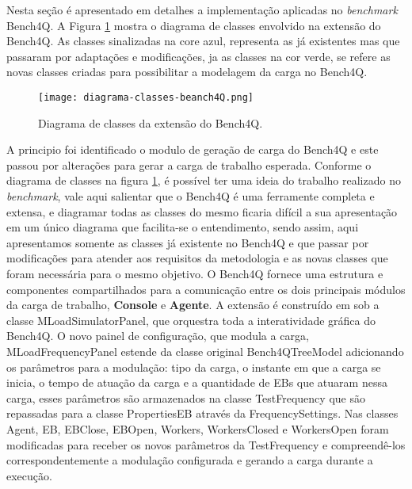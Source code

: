 Nesta seção é apresentado em detalhes a implementação aplicadas no \textit{benchmark} Bench4Q. A Figura \ref{fig:diagrama-classes} mostra o diagrama de classes envolvido na extensão do Bench4Q. As classes sinalizadas na core azul, representa as já existentes mas que passaram por adaptações e modificações, ja as classes na cor verde, se refere as novas classes criadas para possibilitar a modelagem da carga no Bench4Q.

\begin{figure}[htb]
	\centering
	\texttt{[image: diagrama-classes-beanch4Q.png]}	
	\caption{Diagrama de classes da extensão do Bench4Q.}
	\label{fig:diagrama-classes}
	\fautor
\end{figure}


A principio foi identificado o modulo de geração de carga do Bench4Q e este passou por alterações para gerar a carga de trabalho esperada. Conforme o diagrama de classes na figura \ref{fig:diagrama-classes}, é possível ter uma ideia do trabalho realizado no \textit{benchmark}, vale aqui salientar que o Bench4Q é uma ferramente completa e extensa, e diagramar todas as classes do mesmo ficaria difícil a sua apresentação em um único diagrama que facilita-se o entendimento, sendo assim, aqui apresentamos somente as classes já existente no Bench4Q e que passar por modificações para atender aos requisitos da metodologia e as novas classes que foram necessária para o mesmo objetivo.
O Bench4Q fornece uma estrutura e componentes compartilhados para a comunicação entre os dois principais módulos da carga de trabalho, \textbf{Console} e \textbf{Agente}. A extensão é construído em sob a classe \textsf{MLoadSimulatorPanel}, que orquestra toda a interatividade gráfica do Bench4Q. O novo painel de configuração, que modula a carga, \textsf{MLoadFrequencyPanel} estende da classe original \textsf{Bench4QTreeModel} adicionando os parâmetros para a modulação: tipo da carga, o instante em que a carga se inicia, o tempo de atuação da carga e a quantidade de EBs que atuaram nessa carga, esses parâmetros são armazenados na classe \textsf{TestFrequency} que são repassadas para a classe \textsf{PropertiesEB} através da \textsf{FrequencySettings}. Nas classes \textsf{Agent}, \textsf{EB}, \textsf{EBClose}, \textsf{EBOpen}, \textsf{Workers}, \textsf{WorkersClosed} e \textsf{WorkersOpen} foram modificadas para receber os novos parâmetros da \textsf{TestFrequency} e compreendê-los correspondentemente a modulação configurada e gerando a carga durante a execução.

